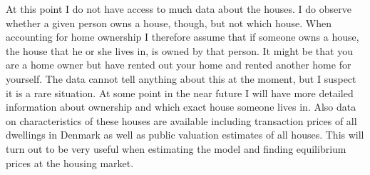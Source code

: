 At this point I do not have access to much data about the houses. I do observe whether a given person owns a house, though, but not which house. When accounting for home ownership I therefore assume that if someone owns a house, the house that he or she lives in, is owned by that person. It might be that you are a home owner but have rented out your home and rented another home for yourself. The data cannot tell anything about this at the moment, but I suspect it is a rare situation. At some point in the near future I will have more detailed information about ownership and which exact house someone lives in. Also data on characteristics of these houses are available including transaction prices of all dwellings in Denmark as well as public valuation estimates of all houses. This will turn out to be very useful when estimating the model and finding equilibrium prices at the housing market.


